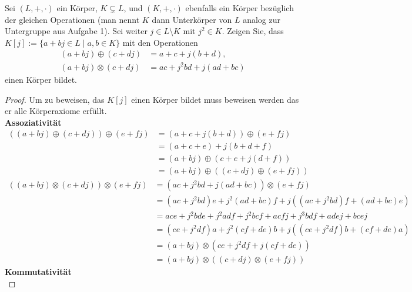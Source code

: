 \documentclass{../problemset}
\begin{document}
\begin{problem}
Sei $(L, +, \cdot)$ ein Körper, $K \subsetneq L$, und $(K, +, \cdot)$ ebenfalls ein Körper bezüglich der gleichen Operationen (man nennt $K$ dann Unterkörper von $L$ analog zur Untergruppe aus Aufgabe 1). Sei weiter $j \in L \setminus K$ mit $j^2 \in K$. Zeigen Sie, dass $K[j] := \{a + bj \in L \mid a, b \in K\}$ mit den Operationen
\begin{align*}
	(a + bj) \oplus (c + dj)  & = a + c + j(b + d),       \\
	(a + bj) \otimes (c + dj) & = ac + j^2bd + j(ad + bc)
\end{align*}
einen Körper bildet.
\begin{proof}
	Um zu beweisen, das $K[j]$ einen Körper bildet muss beweisen werden das er alle Körperaxiome erfüllt. \\
	\textbf{Assoziativität} \\
	\begin{align}
		((a + bj) \oplus (c + dj)) \oplus (e + fj) & = (a + c + j(b + d)) \oplus (e + fj)         \\
		                                           & = (a + c + e ) + j(b + d + f)                \\
		                                           & = (a + bj) \oplus (c + e + j(d + f))         \\
		                                           & = (a + bj) \oplus ((c + dj) \oplus (e + fj))
	\end{align}
	\begin{align}
		((a + bj) \otimes (c + dj)) \otimes (e + fj) & = (ac + j^2bd + j(ad + bc)) \otimes (e + fj)                   \\
		                                             & = (ac+j^2bd)e + j^2(ad + bc)f + j((ac + j^2bd)f + (ad + bc)e)  \\
		                                             & = ace + j^2bde + j^2adf + j^2bcf + acfj + j^3bdf + adej + bcej \\
		                                             & = (ce+j^2df)a + j^2(cf + de)b + j((ce + j^2df)b + (cf + de)a)  \\
		                                             & = (a + bj) \otimes (ce + j^2df + j(cf + de))                   \\
		                                             & = (a + bj) \otimes ((c + dj) \otimes (e + fj))
	\end{align}
	\textbf{Kommutativität} \\

\end{proof}
\end{problem}
\end{document}
